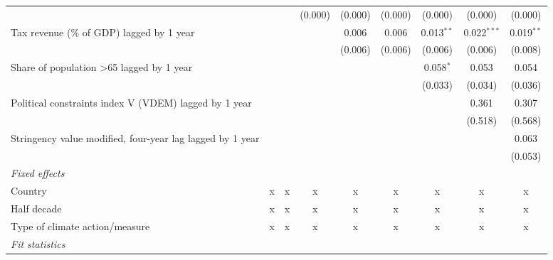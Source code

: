 \begin{tabular}{lcccccccc}
                                                             &              &              & (0.000)      & (0.000) & (0.000) & (0.000)      & (0.000)       & (0.000)\\   
   Tax revenue (\% of GDP) lagged by 1 year                  &              &              &              & 0.006   & 0.006   & 0.013$^{**}$ & 0.022$^{***}$ & 0.019$^{**}$\\   
                                                             &              &              &              & (0.006) & (0.006) & (0.006)      & (0.006)       & (0.008)\\   
   Share of population >65 lagged by 1 year                  &              &              &              &         &         & 0.058$^{*}$  & 0.053         & 0.054\\   
                                                             &              &              &              &         &         & (0.033)      & (0.034)       & (0.036)\\   
   Political constraints index V (VDEM) lagged by 1 year     &              &              &              &         &         &              & 0.361         & 0.307\\   
                                                             &              &              &              &         &         &              & (0.518)       & (0.568)\\   
   Stringency value modified, four-year lag lagged by 1 year &              &              &              &         &         &              &               & 0.063\\   
                                                             &              &              &              &         &         &              &               & (0.053)\\   
   \emph{Fixed effects}\\
   Country                                                   & x            & x            & x            & x       & x       & x            & x             & x\\  
   Half decade                                               & x            & x            & x            & x       & x       & x            & x             & x\\  
   Type of climate action/measure                            & x            & x            & x            & x       & x       & x            & x             & x\\  
   \midrule \emph{Fit statistics}\\

\end{tabular}
